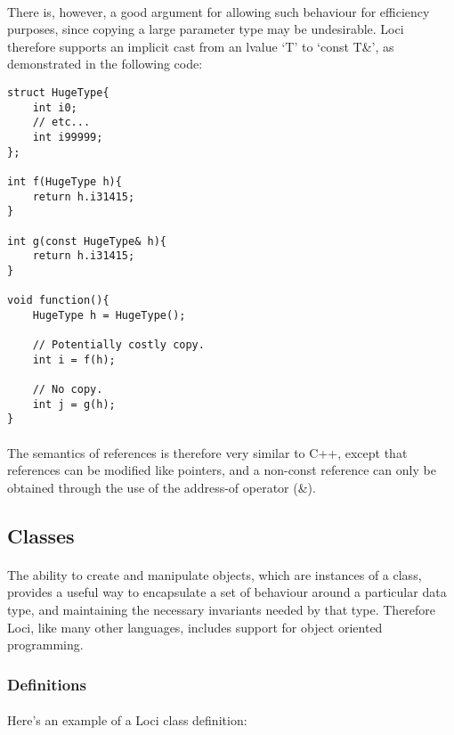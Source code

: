 \documentclass[12pt,twoside,notitlepage]{report}
\begin{document}
\paragraph{}
There is, however, a good argument for allowing such behaviour for efficiency purposes, since copying a large parameter type may be undesirable. Loci therefore supports an implicit cast from an lvalue `T' to `const T\&', as demonstrated in the following code:


\begin{lstlisting}
struct HugeType{
	int i0;
	// etc...
	int i99999;
};

int f(HugeType h){
	return h.i31415;
}

int g(const HugeType& h){
	return h.i31415;
}

void function(){
	HugeType h = HugeType();
	
	// Potentially costly copy.
	int i = f(h);
	
	// No copy.
	int j = g(h);
}
\end{lstlisting}


\paragraph{}
The semantics of references is therefore very similar to C++, except that references can be modified like pointers, and a non-const reference can only be obtained through the use of the address-of operator (\&).

\clearpage

\subsection{Classes}

\paragraph{}
The ability to create and manipulate objects, which are instances of a class, provides a useful way to encapsulate a set of behaviour around a particular data type, and maintaining the necessary invariants needed by that type. Therefore Loci, like many other languages, includes support for object oriented programming.

\subsubsection{Definitions}

\paragraph{}
Here's an example of a Loci class definition:
\end{document}
